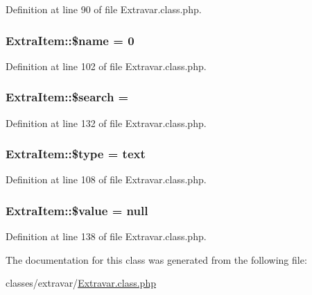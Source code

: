 Definition at line 90 of file Extravar.\+class.\+php.

\subsubsection[{\texorpdfstring{\$name}{$name}}]{\setlength{\rightskip}{0pt plus 5cm}Extra\+Item\+::\$name = 0}\hypertarget{classExtraItem_a32694a2408e9e2cca1d680356cf937d3}{}\label{classExtraItem_a32694a2408e9e2cca1d680356cf937d3}


Definition at line 102 of file Extravar.\+class.\+php.

\subsubsection[{\texorpdfstring{\$search}{$search}}]{\setlength{\rightskip}{0pt plus 5cm}Extra\+Item\+::\$search = \textquotesingle{}}\hypertarget{classExtraItem_a086e30bc8e2d078ad1108d00ae58a60c}{}\label{classExtraItem_a086e30bc8e2d078ad1108d00ae58a60c}


Definition at line 132 of file Extravar.\+class.\+php.

\subsubsection[{\texorpdfstring{\$type}{$type}}]{\setlength{\rightskip}{0pt plus 5cm}Extra\+Item\+::\$type = \textquotesingle{}text\textquotesingle{}}\hypertarget{classExtraItem_ac965cc202d067c0449be9976045fd4be}{}\label{classExtraItem_ac965cc202d067c0449be9976045fd4be}


Definition at line 108 of file Extravar.\+class.\+php.

\subsubsection[{\texorpdfstring{\$value}{$value}}]{\setlength{\rightskip}{0pt plus 5cm}Extra\+Item\+::\$value = {\bf null}}\hypertarget{classExtraItem_a46622b49026acdfce833d5118a43986d}{}\label{classExtraItem_a46622b49026acdfce833d5118a43986d}


Definition at line 138 of file Extravar.\+class.\+php.



The documentation for this class was generated from the following file\+:\begin{DoxyCompactItemize}
\item 
classes/extravar/\hyperlink{Extravar_8class_8php}{Extravar.\+class.\+php}\end{DoxyCompactItemize}
